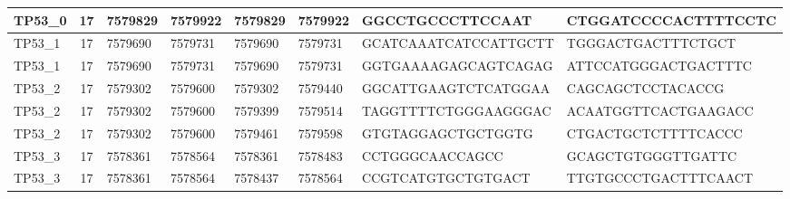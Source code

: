 \begin{landscape}
\begin{longtable}{| p{} | p{} | p{} | p{} | p{} | p{} | p{} | p{} |}
\multicolumn{1}{|l|}{TP53\_0}    & \multicolumn{1}{c|}{17} & \multicolumn{1}{l|}{7579829}   & \multicolumn{1}{l|}{7579922}   & \multicolumn{1}{l|}{7579829}   & \multicolumn{1}{l|}{7579922}   & \multicolumn{1}{l|}{GGCCTGCCCTTCCAAT}                & \multicolumn{1}{l|}{CTGGATCCCCACTTTTCCTC}          \\ \hline
\multicolumn{1}{|l|}{TP53\_1}    & \multicolumn{1}{c|}{17} & \multicolumn{1}{l|}{7579690}   & \multicolumn{1}{l|}{7579731}   & \multicolumn{1}{l|}{7579690}   & \multicolumn{1}{l|}{7579731}   & \multicolumn{1}{l|}{GCATCAAATCATCCATTGCTT}           & \multicolumn{1}{l|}{TGGGACTGACTTTCTGCT}            \\ \hline
\multicolumn{1}{|l|}{TP53\_1}    & \multicolumn{1}{c|}{17} & \multicolumn{1}{l|}{7579690}   & \multicolumn{1}{l|}{7579731}   & \multicolumn{1}{l|}{7579690}   & \multicolumn{1}{l|}{7579731}   & \multicolumn{1}{l|}{GGTGAAAAGAGCAGTCAGAG}            & \multicolumn{1}{l|}{ATTCCATGGGACTGACTTTC}          \\ \hline
\multicolumn{1}{|l|}{TP53\_2}    & \multicolumn{1}{c|}{17} & \multicolumn{1}{l|}{7579302}   & \multicolumn{1}{l|}{7579600}   & \multicolumn{1}{l|}{7579302}   & \multicolumn{1}{l|}{7579440}   & \multicolumn{1}{l|}{GGCATTGAAGTCTCATGGAA}            & \multicolumn{1}{l|}{CAGCAGCTCCTACACCG}             \\ \hline
\multicolumn{1}{|l|}{TP53\_2}    & \multicolumn{1}{c|}{17} & \multicolumn{1}{l|}{7579302}   & \multicolumn{1}{l|}{7579600}   & \multicolumn{1}{l|}{7579399}   & \multicolumn{1}{l|}{7579514}   & \multicolumn{1}{l|}{TAGGTTTTCTGGGAAGGGAC}            & \multicolumn{1}{l|}{ACAATGGTTCACTGAAGACC}          \\ \hline
\multicolumn{1}{|l|}{TP53\_2}    & \multicolumn{1}{c|}{17} & \multicolumn{1}{l|}{7579302}   & \multicolumn{1}{l|}{7579600}   & \multicolumn{1}{l|}{7579461}   & \multicolumn{1}{l|}{7579598}   & \multicolumn{1}{l|}{GTGTAGGAGCTGCTGGTG}              & \multicolumn{1}{l|}{CTGACTGCTCTTTTCACCC}           \\ \hline
\multicolumn{1}{|l|}{TP53\_3}    & \multicolumn{1}{c|}{17} & \multicolumn{1}{l|}{7578361}   & \multicolumn{1}{l|}{7578564}   & \multicolumn{1}{l|}{7578361}   & \multicolumn{1}{l|}{7578483}   & \multicolumn{1}{l|}{CCTGGGCAACCAGCC}                 & \multicolumn{1}{l|}{GCAGCTGTGGGTTGATTC}            \\ \hline
\multicolumn{1}{|l|}{TP53\_3}    & \multicolumn{1}{c|}{17} & \multicolumn{1}{l|}{7578361}   & \multicolumn{1}{l|}{7578564}   & \multicolumn{1}{l|}{7578437}   & \multicolumn{1}{l|}{7578564}   & \multicolumn{1}{l|}{CCGTCATGTGCTGTGACT}              & \multicolumn{1}{l|}{TTGTGCCCTGACTTTCAACT}          \\ \hline

\end{longtable}
\end{landscape}
